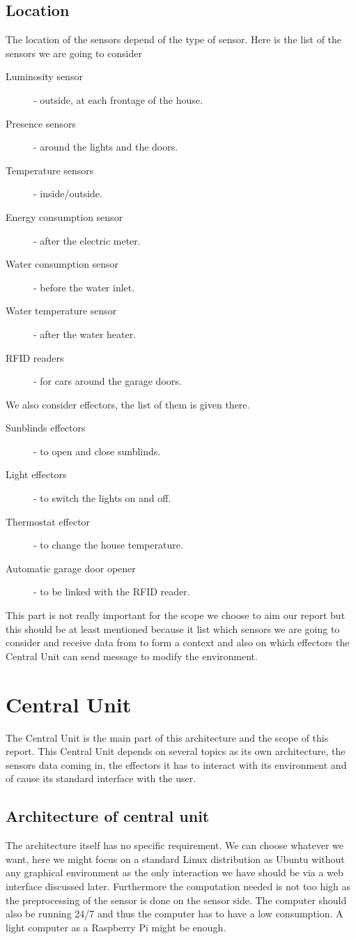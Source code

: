 \documentclass{acm_proc_article-sp}
\begin{document}
\subsection{Location}
The location of the sensors depend of the type of sensor. Here is the list of the sensors we are going to consider
\begin{description}
 \item[Luminosity sensor] - outside, at each frontage of the house.
 \item[Presence sensors] - around the lights and the doors.
 \item[Temperature sensors] - inside/outside.
 \item[Energy consumption sensor] - after the electric meter.
 \item[Water consumption sensor] - before the water inlet.
 \item[Water temperature sensor] - after the water heater.
 \item[RFID readers] - for cars around the garage doors.
\end{description}
We also consider effectors, the list of them is given there.
\begin{description}
 \item[Sunblinds effectors] - to open and close sunblinds.
 \item[Light effectors] - to switch the lights on and off.
 \item[Thermostat effector] - to change the house temperature.
 \item[Automatic garage door opener] - to be linked with the RFID reader.
\end{description}
This part is not really important for the scope we choose to aim our report but this should be at least mentioned because it list which sensors we are going to consider and receive data from to form a context and also on which effectors the Central Unit can send message to modify the environment.
\section{Central Unit}	
The Central Unit is the main part of this architecture and the scope of this report. 
This Central Unit depends on several topics as its own architecture, the sensors data coming in, 
the effectors it has to interact with its environment and of cause its standard interface with the user.
\subsection{Architecture of central unit}
The architecture itself has no specific requirement. 
We can choose whatever we want, here we might focus on a standard Linux distribution as Ubuntu without any graphical environment as the only interaction we have should be via a web interface discussed later. 
Furthermore the computation needed is not too high as the preprocessing of the sensor is done on the sensor side. 
The computer should also be running 24/7 and thus the computer has to have a low consumption. A light computer as a Raspberry Pi might be enough.
\end{document}
